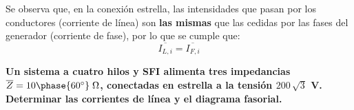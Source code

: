 	Se observa que, en la conexión estrella, las intensidades que pasan por los conductores (corriente de línea) son \textbf{las mismas} que las cedidas por las fases del generador (corriente de fase), por lo que se cumple que:
	\begin{equation}
	    \boxed{\overline{I_{L,i}}=\overline{I_{F,i}}}
	\end{equation}
	

	
	
    \vspace{4mm}
    \begin{example}\label{ej.3-1}
	    \textbf{Un sistema a cuatro hilos y SFI alimenta tres impedancias $\overline{Z}=10\phase{60^\circ}\;\Omega$, conectadas en estrella a la tensión $200\,\sqrt{3}$ V. Determinar las corrientes de línea y el diagrama fasorial.}
	    

\end{example}

